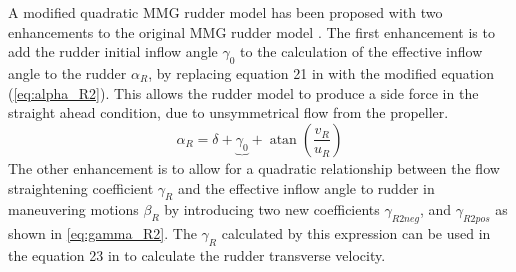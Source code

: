 A modified quadratic MMG rudder model has been proposed with two enhancements to the original MMG rudder model \citep{yasukawaIntroductionMMGStandard2015}. The first enhancement is to add the rudder initial inflow angle $\gamma_0$ to the calculation of the effective inflow angle to the rudder $\alpha_R$, by replacing equation 21 in \citet{yasukawaIntroductionMMGStandard2015} with the modified equation (\autoref{eq:alpha_R2}). This allows the rudder model to produce a side force in the straight ahead condition, due to unsymmetrical flow from the propeller. 
\begin{equation}
    \label{eq:alpha_R2}
    \alpha_{R} = \delta + \underbrace{\gamma_{0}}_{~} + \operatorname{atan}{\left(\frac{v_{R}}{u_{R}} \right)}
\end{equation}
The other enhancement is to allow for a quadratic relationship between the flow straightening coefficient $\gamma_R$ and the effective inflow angle to rudder in maneuvering motions $\beta_R$ by introducing two new coefficients $\gamma_{R2neg}$, and $\gamma_{R2pos}$ as shown in \autoref{eq:gamma_R2}. The $\gamma_R$ calculated by this expression can be used in the equation 23 in \citet{yasukawaIntroductionMMGStandard2015} to calculate the rudder transverse velocity.  
\begin{equation}
    \label{eq:gamma_R2}
    
\end{equation}

